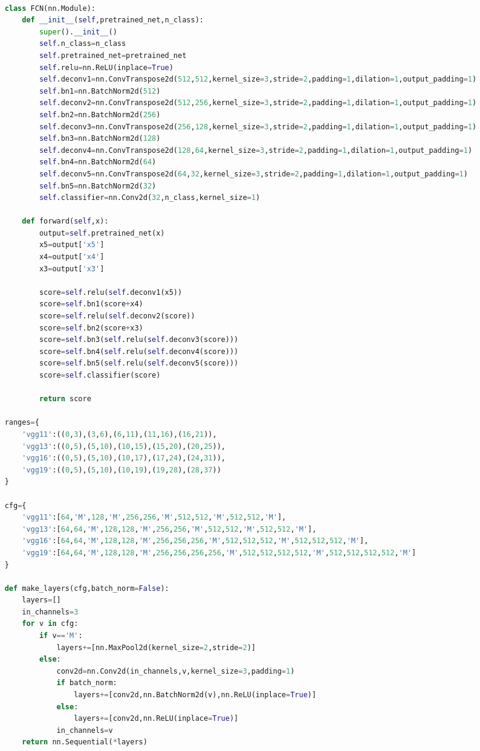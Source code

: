 \documentclass[supercite]{HustGraduPaper}
\begin{document}
\begin{sloppypar}
\begin{appendices}
\begin{spacing}{1.25}
\begin{lstlisting}[language=python]
    
    class FCN(nn.Module):
        def __init__(self,pretrained_net,n_class):
            super().__init__()
            self.n_class=n_class
            self.pretrained_net=pretrained_net
            self.relu=nn.ReLU(inplace=True)
            self.deconv1=nn.ConvTranspose2d(512,512,kernel_size=3,stride=2,padding=1,dilation=1,output_padding=1)
            self.bn1=nn.BatchNorm2d(512)
            self.deconv2=nn.ConvTranspose2d(512,256,kernel_size=3,stride=2,padding=1,dilation=1,output_padding=1)
            self.bn2=nn.BatchNorm2d(256)
            self.deconv3=nn.ConvTranspose2d(256,128,kernel_size=3,stride=2,padding=1,dilation=1,output_padding=1)
            self.bn3=nn.BatchNorm2d(128)
            self.deconv4=nn.ConvTranspose2d(128,64,kernel_size=3,stride=2,padding=1,dilation=1,output_padding=1)
            self.bn4=nn.BatchNorm2d(64)
            self.deconv5=nn.ConvTranspose2d(64,32,kernel_size=3,stride=2,padding=1,dilation=1,output_padding=1)
            self.bn5=nn.BatchNorm2d(32)
            self.classifier=nn.Conv2d(32,n_class,kernel_size=1)
    
        def forward(self,x):
            output=self.pretrained_net(x)
            x5=output['x5']
            x4=output['x4']
            x3=output['x3']
    
            score=self.relu(self.deconv1(x5))
            score=self.bn1(score+x4)
            score=self.relu(self.deconv2(score))
            score=self.bn2(score+x3)
            score=self.bn3(self.relu(self.deconv3(score)))
            score=self.bn4(self.relu(self.deconv4(score)))
            score=self.bn5(self.relu(self.deconv5(score)))
            score=self.classifier(score)
    
            return score
    
    ranges={
        'vgg11':((0,3),(3,6),(6,11),(11,16),(16,21)),
        'vgg13':((0,5),(5,10),(10,15),(15,20),(20,25)),
        'vgg16':((0,5),(5,10),(10,17),(17,24),(24,31)),
        'vgg19':((0,5),(5,10),(10,19),(19,28),(28,37))
    }
    
    cfg={
        'vgg11':[64,'M',128,'M',256,256,'M',512,512,'M',512,512,'M'],
        'vgg13':[64,64,'M',128,128,'M',256,256,'M',512,512,'M',512,512,'M'],
        'vgg16':[64,64,'M',128,128,'M',256,256,256,'M',512,512,512,'M',512,512,512,'M'],
        'vgg19':[64,64,'M',128,128,'M',256,256,256,256,'M',512,512,512,512,'M',512,512,512,512,'M']
    }
    
    def make_layers(cfg,batch_norm=False):
        layers=[]
        in_channels=3
        for v in cfg:
            if v=='M':
                layers+=[nn.MaxPool2d(kernel_size=2,stride=2)]
            else:
                conv2d=nn.Conv2d(in_channels,v,kernel_size=3,padding=1)
                if batch_norm:
                    layers+=[conv2d,nn.BatchNorm2d(v),nn.ReLU(inplace=True)]
                else:
                    layers+=[conv2d,nn.ReLU(inplace=True)]
                in_channels=v
        return nn.Sequential(*layers)
    

\end{lstlisting}
\end{spacing}
\end{appendices}
\end{sloppypar}
\end{document}
